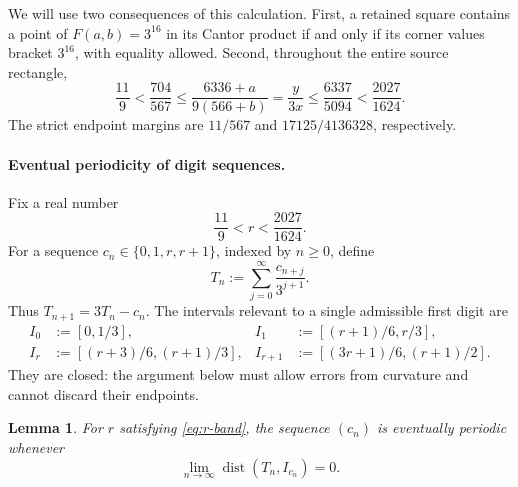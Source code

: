 \documentclass[11pt,a4paper]{amsart}
\numberwithin{equation}{section}
\newtheorem{lemma}[theorem]{Lemma}
\theoremstyle{definition}
\begin{document}
We will use two consequences of this calculation.
First, a retained square contains a point of
\(F(a,b)=3^{16}\) in its Cantor product if and only if its corner
values bracket \(3^{16}\), with equality allowed.
Second, throughout the entire source rectangle,
\begin{equation}\label{eq:normal-band}
\frac{11}{9}<\frac{704}{567}
\leq\frac{6336+a}{9(566+b)}
=\frac{y}{3x}
\leq\frac{6337}{5094}<\frac{2027}{1624}.
\end{equation}
The strict endpoint margins are \(11/567\) and
\(17125/4136328\), respectively.

\paragraph{Eventual periodicity of digit sequences.}\label{sec:digits}

Fix a real number
\begin{equation}\label{eq:r-band}
\frac{11}{9}<r<\frac{2027}{1624}.
\end{equation}
For a sequence \(c_n\in\{0,1,r,r+1\}\), indexed by \(n\geq0\), define
\[
T_n:=\sum_{j=0}^{\infty}\frac{c_{n+j}}{3^{j+1}}.
\]
Thus \(T_{n+1}=3T_n-c_n\).
The intervals relevant to a single admissible first digit are
\begin{equation}\label{eq:exclusive-domains}
\begin{aligned}
I_0&:=[0,1/3],
&I_1&:=[(r+1)/6,r/3],\\
I_r&:=[(r+3)/6,(r+1)/3],
&I_{r+1}&:=[(3r+1)/6,(r+1)/2].
\end{aligned}
\end{equation}
They are closed: the argument below must allow errors from curvature
and cannot discard their endpoints.

\begin{lemma}\label{lem:periodicity}
For \(r\) satisfying \eqref{eq:r-band}, the sequence \((c_n)\) is
eventually periodic whenever
\[
\lim_{n\to\infty}\operatorname{dist}(T_n,I_{c_n})=0.
\]
\end{lemma}
\end{document}

